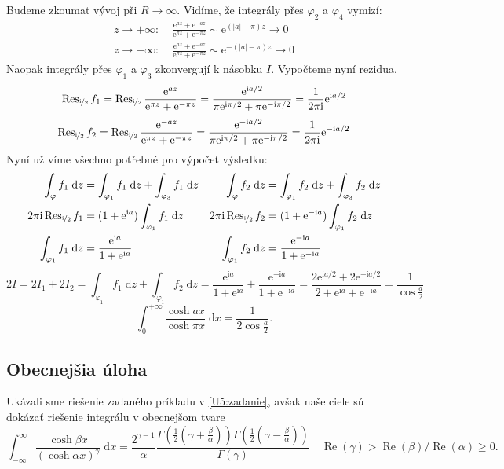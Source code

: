 \documentclass[10pt,a4paper]{article}
\newcommand{\const}[1]{\text{#1}}
\newcommand{\Res}{\operatorname{Res}}
\renewcommand{\d}[1]{\;\const{d}#1}
\newcommand{\e}[1]{\const{e}^{#1}}
\renewcommand{\i}{\const{i}}
\begin{document}
Budeme zkoumat vývoj při $R \to \infty$. Vidíme, že integrály přes $\varphi_2$ a $\varphi_4$ vymizí:
\begin{align*}
    z \to +\infty: \; &\frac{\e{az} + \e{-az}}{\e{\pi z} + \e{-\pi z}}
    \sim \e{(|a|-\pi)z} \to 0
    \\
    z \to -\infty: \; &\frac{\e{az} + \e{-az}}{\e{\pi z} + \e{-\pi z}}
    \sim \e{-(|a|-\pi)z} \to 0
\end{align*}
Naopak integrály přes $\varphi_1$ a $\varphi_3$ zkonvergují k násobku $I$. Vypočteme nyní rezidua.
\begin{equation*}
    \Res_{\nicefrac{\i}{2}} f_1
    = \Res_{\nicefrac{\i}{2}} \frac{\e{az}}{\e{\pi z} + \e{-\pi z}}
    = \frac{\e{\i a/2}}{\pi\e{\i\pi/2} + \pi\e{-\i\pi/2}}
    = \frac{1}{2\pi\i} \e{\i a/2}
\end{equation*}
\begin{equation*}
    \Res_{\nicefrac{\i}{2}} f_2
    = \Res_{\nicefrac{\i}{2}} \frac{\e{-az}}{\e{\pi z} + \e{-\pi z}}
    = \frac{\e{-\i a/2}}{\pi\e{\i\pi/2} + \pi\e{-\i\pi/2}}
    = \frac{1}{2\pi\i} \e{-\i a/2}
\end{equation*}
Nyní už víme všechno potřebné pro výpočet výsledku:
\begin{align*}
    \int_\varphi f_1 \d{z}
    &= \int_{\varphi_1} f_1 \d{z} + \int_{\varphi_3} f_1 \d{z}
    &
    \int_\varphi f_2 \d{z}
    &= \int_{\varphi_1} f_2 \d{z} + \int_{\varphi_3} f_2 \d{z}
    \\
    2\pi\i \Res_{\nicefrac{\i}{2}} f_1
    &= (1+\e{\i a}) \int_{\varphi_1} f_1 \d{z}
    &
    2\pi\i \Res_{\nicefrac{\i}{2}} f_2
    &= (1+\e{-\i a}) \int_{\varphi_1} f_2 \d{z}
    \\
    \int_{\varphi_1} f_1 \d{z}
    &= \frac{\e{\i a}}{1+\e{\i a}}
    &
    \int_{\varphi_1} f_2 \d{z}
    &= \frac{\e{-\i a}}{1+\e{-\i a}}
\end{align*}
\begin{equation*}
    2I = 2I_1 + 2I_2
    = \int_{\varphi_1} f_1 \d{z} + \int_{\varphi_1} f_2 \d{z}
    = \frac{\e{\i a}}{1+\e{\i a}} + \frac{\e{-\i a}}{1+\e{-\i a}}
    = \frac{2\e{\i a/2} + 2\e{-\i a/2}}{2 + \e{\i a} + \e{-\i a}}
    = \frac{1}{\cos \frac{a}{2}}
\end{equation*}
\bigskip
\begin{equation*}
    \int_0^{+\infty}\frac{\cosh ax}{\cosh \pi x} \d{x} = \frac{1}{2 \cos \frac{a}{2}}.
\end{equation*}
\subsection{Obecnejšia úloha}
Ukázali sme riešenie zadaného príkladu v \ref{U5:zadanie}, avšak naše ciele sú dokázať riešenie integrálu v obecnejšom tvare
\begin{equation}
\int_{-\infty}^{\infty} \frac{\cosh \beta x}{(\cosh \alpha x)^{\gamma}} \d x=\frac{2^{\gamma-1}}{\alpha} \frac{\Gamma\left(\frac{1}{2}\left(\gamma+\frac{\beta}{\alpha}\right)\right) \Gamma\left(\frac{1}{2}\left(\gamma-\frac{\beta}{\alpha}\right)\right)}{\Gamma(\gamma)} \quad \operatorname{Re}(\gamma)>\operatorname{Re}(\beta)/\operatorname{Re}(\alpha) \geq 0.
\end{equation}
\end{document}
